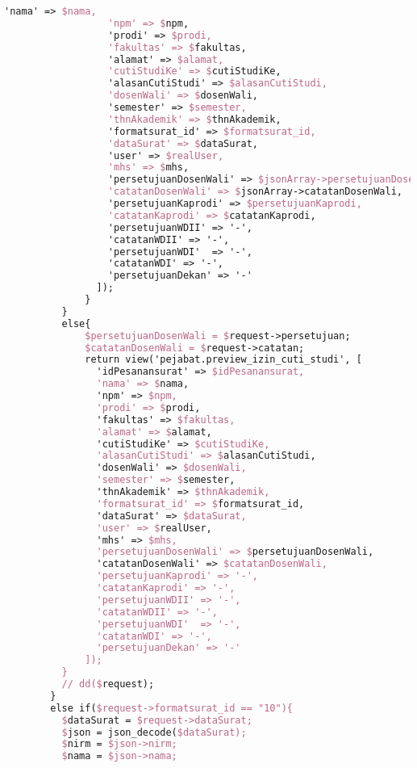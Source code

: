 \begin{lstlisting}[language=tex,basicstyle=\tiny,caption=PesanansuratController.php]
                  'nama' => $nama,
                  'npm' => $npm,
                  'prodi' => $prodi,
                  'fakultas' => $fakultas,
                  'alamat' => $alamat,
                  'cutiStudiKe' => $cutiStudiKe,
                  'alasanCutiStudi' => $alasanCutiStudi,
                  'dosenWali' => $dosenWali,
                  'semester' => $semester,
                  'thnAkademik' => $thnAkademik,
                  'formatsurat_id' => $formatsurat_id,
                  'dataSurat' => $dataSurat,
                  'user' => $realUser,
                  'mhs' => $mhs,
                  'persetujuanDosenWali' => $jsonArray->persetujuanDosenWali,
                  'catatanDosenWali' => $jsonArray->catatanDosenWali,
                  'persetujuanKaprodi' => $persetujuanKaprodi,
                  'catatanKaprodi' => $catatanKaprodi,
                  'persetujuanWDII' => '-',
                  'catatanWDII' => '-',
                  'persetujuanWDI'  => '-',
                  'catatanWDI' => '-',
                  'persetujuanDekan' => '-'
                ]);
              }
          }
          else{
              $persetujuanDosenWali = $request->persetujuan;
              $catatanDosenWali = $request->catatan;
              return view('pejabat.preview_izin_cuti_studi', [
                'idPesanansurat' => $idPesanansurat,
                'nama' => $nama,
                'npm' => $npm,
                'prodi' => $prodi,
                'fakultas' => $fakultas,
                'alamat' => $alamat,
                'cutiStudiKe' => $cutiStudiKe,
                'alasanCutiStudi' => $alasanCutiStudi,
                'dosenWali' => $dosenWali,
                'semester' => $semester,
                'thnAkademik' => $thnAkademik,
                'formatsurat_id' => $formatsurat_id,
                'dataSurat' => $dataSurat,
                'user' => $realUser,
                'mhs' => $mhs,
                'persetujuanDosenWali' => $persetujuanDosenWali,
                'catatanDosenWali' => $catatanDosenWali,
                'persetujuanKaprodi' => '-',
                'catatanKaprodi' => '-',
                'persetujuanWDII' => '-',
                'catatanWDII' => '-',
                'persetujuanWDI'  => '-',
                'catatanWDI' => '-',
                'persetujuanDekan' => '-'
              ]);
          }
          // dd($request);
        }
        else if($request->formatsurat_id == "10"){
          $dataSurat = $request->dataSurat;
          $json = json_decode($dataSurat);
          $nirm = $json->nirm;
          $nama = $json->nama;

\end{lstlisting}
